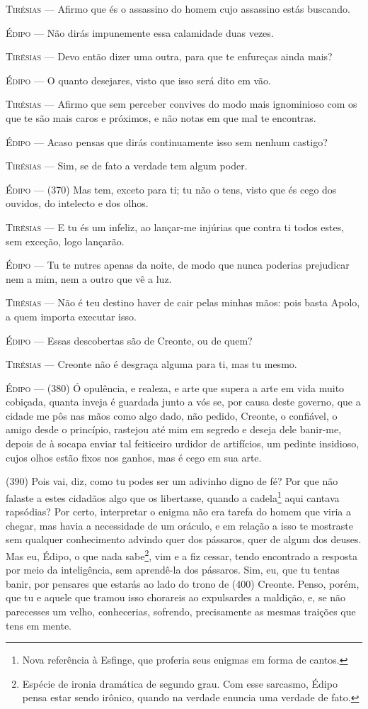\textsc{Tirésias} --- Afirmo que és o assassino do homem cujo assassino estás buscando.

\textsc{Édipo} --- Não dirás impunemente essa calamidade duas vezes.

\textsc{Tirésias} --- Devo então dizer uma outra, para que te enfureças ainda mais?

\textsc{Édipo} --- O quanto desejares, visto que isso será dito em vão.

\textsc{Tirésias} --- Afirmo que sem perceber convives do modo mais ignominioso com os que te
são mais caros e próximos, e não notas em que mal te encontras.

\textsc{Édipo} --- Acaso pensas que dirás continuamente isso sem nenhum castigo?

\textsc{Tirésias} --- Sim, se de fato a verdade tem algum poder.

\textsc{Édipo} --- (370) Mas tem, exceto para ti; tu não o tens, visto que és cego dos
ouvidos, do intelecto e dos olhos.

\textsc{Tirésias} --- E tu és um infeliz, ao lançar-me injúrias que contra ti todos estes, sem
exceção, logo lançarão.

\textsc{Édipo} --- Tu te nutres apenas da noite, de modo que nunca poderias prejudicar nem
a mim, nem a outro que vê a luz.

\textsc{Tirésias} --- Não é teu destino haver de cair pelas minhas mãos: pois basta Apolo, a
quem importa executar isso.

\textsc{Édipo} --- Essas descobertas são de Creonte, ou de quem?

\textsc{Tirésias} --- Creonte não é desgraça alguma para ti, mas tu mesmo.

\textsc{Édipo} --- (380) Ó opulência, e realeza, e arte que supera a arte em vida muito
cobiçada, quanta inveja é guardada junto a vós se, por causa deste
governo, que a cidade me pôs nas mãos como algo dado, não pedido,
Creonte, o confiável, o amigo desde o princípio, rastejou até mim em
segredo e deseja dele banir-me, depois de à socapa enviar tal feiticeiro
urdidor de artifícios, um pedinte insidioso, cujos olhos estão fixos nos
ganhos, mas é cego em sua arte.

(390) Pois vai, diz, como tu podes ser um adivinho digno de fé? Por que
não falaste a estes cidadãos algo que os libertasse, quando a
cadela\footnote{Nova referência à Esfinge, que proferia seus enigmas em
  forma de cantos.} aqui cantava rapsódias? Por certo, interpretar o
enigma não era tarefa do homem que viria a chegar, mas havia a
necessidade de um oráculo, e em relação a isso te mostraste sem qualquer
conhecimento advindo quer dos pássaros, quer de algum dos deuses. Mas
eu, Édipo, o que nada sabe\footnote{Espécie de ironia dramática de
  segundo grau. Com esse sarcasmo, Édipo pensa estar sendo irônico,
  quando na verdade enuncia uma verdade de fato.}, vim e a fiz cessar,
tendo encontrado a resposta por meio da inteligência, sem aprendê-la dos
pássaros. Sim, eu, que tu tentas banir, por pensares que estarás ao lado
do trono de (400) Creonte. Penso, porém, que tu e aquele que tramou isso
chorareis ao expulsardes a maldição, e, se não parecesses um velho,
conhecerias, sofrendo, precisamente as mesmas traições que tens em
mente.

